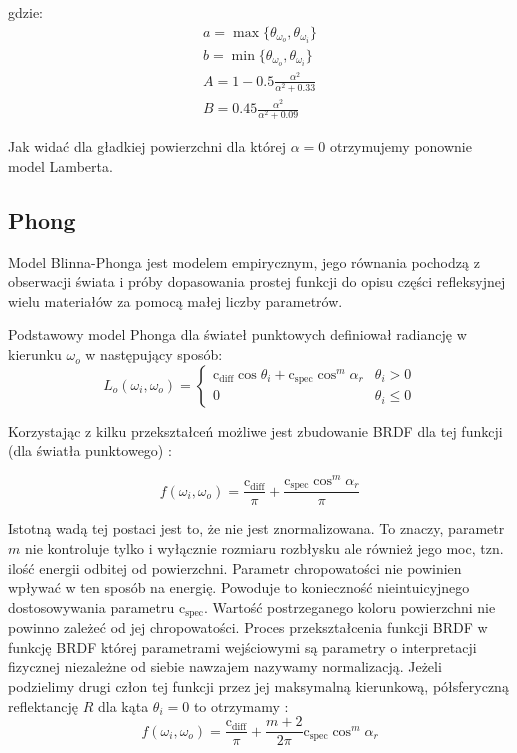 \documentclass[../main.tex]{subfiles}
\newcommand{\cdiff}{\text{c}_{\text{diff}}}
\newcommand{\cspec}{\text{c}_{\text{spec}}}
\begin{document}

\noindent gdzie:
\begin{gather*}
  a = \max \{ \theta_{\omega_o}, \theta_{\omega_i} \} \\
  b = \min \{ \theta_{\omega_o}, \theta_{\omega_i} \} \\
  A = 1 - 0.5 \frac{\alpha^2}{\alpha^2 + 0.33} \\
  B = 0.45 \frac{\alpha^2}{\alpha^2 + 0.09}
\end{gather*}

Jak widać dla gładkiej powierzchni dla której $\alpha=0$ otrzymujemy
ponownie model Lamberta.


\subsection{Phong}

Model Blinna-Phonga jest modelem empirycznym, jego równania pochodzą z obserwacji świata i próby dopasowania prostej funkcji do opisu części refleksyjnej wielu materiałów za pomocą małej liczby parametrów.

Podstawowy model Phonga dla świateł punktowych definiował radiancję w kierunku $\omega_o$ w następujący sposób:
\[
L_{o}(\omega_i, \omega_o) = \begin{cases}
\cdiff \cos\theta_i + \cspec \cos^{m}{\alpha_r} & \theta_i > 0 \\
0 & \theta_i \leq 0
\end{cases}
\]

Korzystając z kilku przekształceń możliwe jest zbudowanie BRDF dla tej funkcji (dla światła punktowego) \cite{RealTimeRendering2008}:

\[
f(\omega_i, \omega_o) = \frac{\cdiff}{\pi} + \frac{\cspec \cos^{m} \alpha_r}{\pi}
\]

Istotną wadą tej postaci jest to, że nie jest znormalizowana. To znaczy, parametr $m$ nie kontroluje tylko i wyłącznie rozmiaru rozbłysku ale również jego moc, tzn. ilość energii odbitej od powierzchni. Parametr chropowatości nie powinien wpływać w ten sposób na energię. Powoduje to konieczność nieintuicyjnego dostosowywania parametru $\cspec$. Wartość postrzeganego koloru powierzchni nie powinno zależeć od jej chropowatości. Proces przekształcenia funkcji BRDF w funkcję BRDF której parametrami wejściowymi są parametry o interpretacji fizycznej niezależne od siebie nawzajem nazywamy normalizacją.  Jeżeli podzielimy drugi człon tej funkcji przez jej maksymalną kierunkową, półsferyczną reflektancję $R$ dla kąta $\theta_i = 0$ to otrzymamy \cite{RealTimeRendering2008}:
\[
  f(\omega_i, \omega_o) = \frac{\cdiff}{\pi} + \frac{m+2}{2\pi} {\cspec \cos^{m} \alpha_r}
\]
\end{document}

